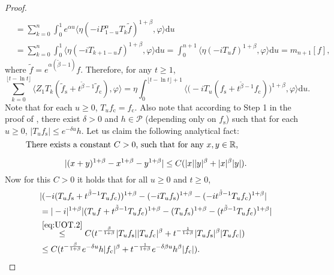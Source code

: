 \documentclass[12pt,a4paper]{amsart}
\theoremstyle{plain}
\theoremstyle{definition}
\numberwithin{equation}{section}
\begin{document}
\begin{proof}
\begin{align}
 \\& = \sum_{k=0}^n \int_0^1 e^{\alpha u} \langle \eta (-iP_{1 - u}^\alpha T_{k}\tilde f)^{1+\beta}, \varphi \rangle \mathrm du
 \\& = \sum_{k=0}^n \int_0^1 \langle \eta (-iT_{k+1 - u} f)^{1+\beta}, \varphi\rangle \mathrm du
 = \int_0^{n+1} \langle  \eta (-iT_{u} f)^{1+\beta}, \varphi\rangle \mathrm du = m_{n+1}[f],
 \end{align}
where $\tilde f=e^{\alpha(\tilde \beta - 1)} f$.
Therefore, for any $t\geq 1$,
\begin{equation} \label{eq:UOT.15}
\sum_{k=0}^{\lfloor t-\ln t \rfloor} \langle Z_1T_{k}(\tilde f_\mathrm s+t^{\tilde{\beta}-1}\tilde{f}_\mathrm c), \varphi\rangle
=\eta \int_0^{\lfloor t-\ln t \rfloor+1}\big\langle \big(-iT_u(f_\mathrm s+t^{\tilde{\beta}-1}f_\mathrm c)\big)^{1+\beta},\varphi \big\rangle \mathrm du.
\end{equation}
Note that for each $u\geq 0$, $T_uf_\mathrm c=f_\mathrm c$.
 Also note that according to
 Step 1 in the proof of \cite[Lemma 2.6]{RenSongSunZhao2019Stable}, there exist $\delta> 0$ and
$h\in \mathcal P$ (depending only on $f_\mathrm s$)
such that for each $u\geq 0$,
 $|T_uf_\mathrm s|\leq e^{-\delta u}h$.
%
Let us claim the following analytical fact:
\begin{equation}\label{eq:UOT.2}
\begin{minipage}{0.9\textwidth}
	There exists a constant $C>0$, such that for any $x,y \in \mathbb R$,
	\[
	|(x+y)^{1+\beta}-x^{1+\beta}-y^{1+\beta}|\leq C(|x||y|^{\beta}+|x|^{\beta}|y|).
	\]
\end{minipage}
\end{equation}
Now for this $C>0$ it holds that for all $u\geq 0$ and $t\geq 0$,
\begin{align}
  &|(-i(T_uf_\mathrm s+t^{\tilde{\beta}-1}T_uf_\mathrm c))^{1+\beta}-(-iT_uf_\mathrm s)^{1+\beta}-(-it^{\tilde{\beta}-1}T_uf_\mathrm c)^{1+\beta}|
  \\&  = |-i|^{1+\beta} |(T_u f + t^{\tilde \beta -1} T_u f_\mathrm c)^{1+\beta} - (T_u f_\mathrm s)^{1+\beta} - (t^{\tilde \beta - 1}T_u f_\mathrm c)^{1+\beta}|
  \\&\overset{\eqref{eq:UOT.2}}\leq  C(t^{-\frac{\beta}{1+\beta}}|T_uf_\mathrm s||T_uf_\mathrm c|^{\beta}+t^{-\frac{1}{1+\beta}}|T_uf_\mathrm s|^{\beta}|T_uf_\mathrm c|)
  \\&\label{eq:UOT.21}\leq C(t^{-\frac{\beta}{1+\beta}}e^{-\delta u}h|f_\mathrm c|^{\beta}+t^{-\frac{1}{1+\beta}}e^{-\delta\beta u}h^{\beta}|f_\mathrm c|).

\end{align}
\end{proof}
\end{document}
